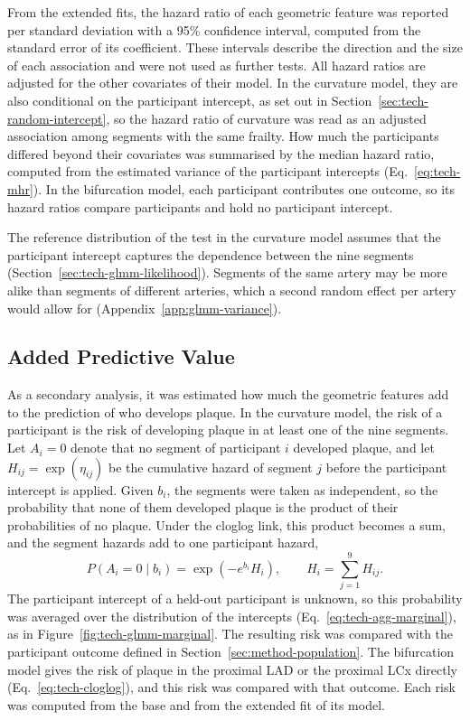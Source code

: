 From the extended fits, the hazard ratio of each geometric feature was reported per standard deviation with a 95\% confidence interval, computed from the standard error of its coefficient.
These intervals describe the direction and the size of each association and were not used as further tests.
All hazard ratios are adjusted for the other covariates of their model.
In the curvature model, they are also conditional on the participant intercept, as set out in Section~\ref{sec:tech-random-intercept}, so the hazard ratio of curvature was read as an adjusted association among segments with the same frailty.
How much the participants differed beyond their covariates was summarised by the median hazard ratio, computed from the estimated variance of the participant intercepts (Eq.~\eqref{eq:tech-mhr}).
In the bifurcation model, each participant contributes one outcome, so its hazard ratios compare participants and hold no participant intercept.

The reference distribution of the test in the curvature model assumes that the participant intercept captures the dependence between the nine segments (Section~\ref{sec:tech-glmm-likelihood}).
Segments of the same artery may be more alike than segments of different arteries, which a second random effect per artery would allow for (Appendix~\ref{app:glmm-variance}).

\subsection{Added Predictive Value}
\label{sec:method-added-value}

As a secondary analysis, it was estimated how much the geometric features add to the prediction of who develops plaque.
In the curvature model, the risk of a participant is the risk of developing plaque in at least one of the nine segments.
Let $A_i = 0$ denote that no segment of participant $i$ developed plaque, and let $H_{ij} = \exp(\eta_{ij})$ be the cumulative hazard of segment $j$ before the participant intercept is applied.
Given $b_i$, the segments were taken as independent, so the probability that none of them developed plaque is the product of their probabilities of no plaque.
Under the cloglog link, this product becomes a sum, and the segment hazards add to one participant hazard,
\begin{equation}
  P(A_i = 0 \mid b_i) = \exp\!\left(-e^{b_i} H_i\right),
  \qquad
  H_i = \sum_{j=1}^{9} H_{ij} .
  \label{eq:method-agg-conditional}
\end{equation}
The participant intercept of a held-out participant is unknown, so this probability was averaged over the distribution of the intercepts (Eq.~\eqref{eq:tech-agg-marginal}), as in Figure~\ref{fig:tech-glmm-marginal}.
The resulting risk was compared with the participant outcome defined in Section~\ref{sec:method-population}.
The bifurcation model gives the risk of plaque in the proximal LAD or the proximal LCx directly (Eq.~\eqref{eq:tech-cloglog}), and this risk was compared with that outcome.
Each risk was computed from the base and from the extended fit of its model.

